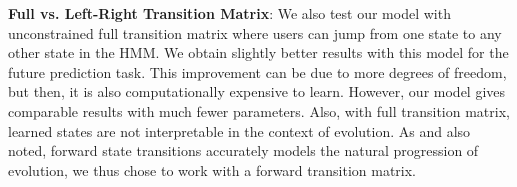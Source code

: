 \textbf{Full vs. Left-Right Transition Matrix}: We also test our model with unconstrained full transition matrix where users can jump from one state to any other state in the HMM. We obtain slightly better results with this model for the future prediction task. This improvement can be due to more degrees of freedom, but then, it is also computationally expensive to learn. However, our model gives comparable results with much fewer parameters. Also, with full transition matrix, learned states are not interpretable in the context of evolution. As \citet{Yang:2014} and \citet{Knab2003} also noted, forward state transitions accurately models the natural progression of evolution, we thus chose to work with a forward transition matrix.
